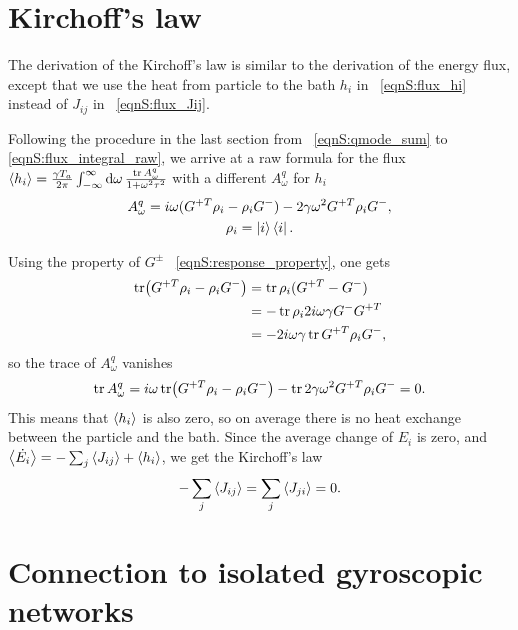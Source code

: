 \documentclass[
 amsmath,amssymb,
 aps,
 pre,
 longbibliography,
 10pt, onecolumn,
 notitlepage
]{revtex4-1}
\begin{document}
\section{Kirchoff's law}
The derivation of the Kirchoff's law is similar to the derivation of the energy flux, except that we use the heat from particle to the bath $h_i$ in \eqnname~\eqref{eqnS:flux_hi} instead of $J_{ij}$ in \eqnname~\eqref{eqnS:flux_Jij}.

Following the procedure in the last section from \eqnname~\eqref{eqnS:qmode_sum} to \eqref{eqnS:flux_integral_raw}, we arrive at a raw formula for the flux $\expval{h_i} = \frac{\gamma T_a}{2\pi} \int_{-\infty}^{\infty} \dd{\omega} \frac{\tr A_\omega^q}{1+\omega^2\tau^2}$ with a different $A_\omega^q$ for $h_i$
\begin{gather}
A_\omega^q = i\omega (G^{+T} \rho_i - \rho_iG^-) - 2\gamma\omega^2 G^{+T} \rho_i G^- ,\\
\rho_i = \ket{i}\bra{i} .
\end{gather}

Using the property of $G^\pm$ \eqnname~\eqref{eqnS:response_property}, one gets
\begin{equation}
\begin{split}
\tr (G^{+T} \rho_i - \rho_iG^-)
&= \tr \rho_i(G^{+T} - G^-) \\
&= -\tr \rho_i 2i\omega \gamma G^- G^{+T} \\
&= -2i\omega\gamma \tr G^{+T}\rho_i G^- ,
\end{split}
\end{equation}
so the trace of $A_\omega^q$ vanishes
\begin{equation}
\tr A_\omega^q
= i\omega \tr (G^{+T} \rho_i - \rho_iG^-) - \tr 2\gamma\omega^2 G^{+T} \rho_i G^-
= 0 .
\end{equation}
This means that $\expval{h_i}$ is also zero, so on average there is no heat exchange between the particle and the bath. Since the average change of $E_i$ is zero, and $\expval{\dot{E_i}} = -\sum_j\expval{J_{ij}} + \expval{h_i}$, we get the Kirchoff's law
\begin{equation}
    -\sum_j\expval{J_{ij}} = \sum_j\expval{J_{ji}} = 0 .
\end{equation}


\section{Connection to isolated gyroscopic networks}
\end{document}
